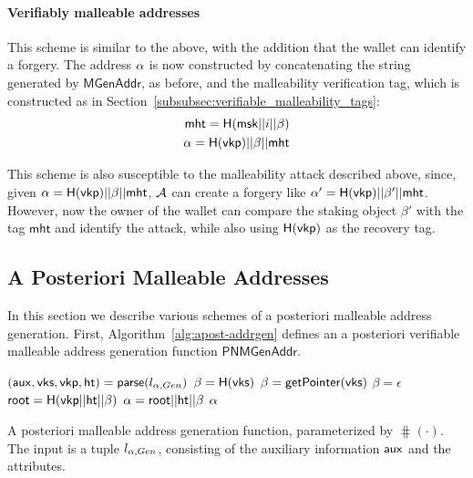 \paragraph{Verifiably malleable addresses}
This scheme is similar to the above, with the addition that the wallet can
identify a forgery.  The address $\alpha$ is now constructed by concatenating
the string generated by $\mathsf{MGenAddr}$, as before, and the malleability
verification tag, which is constructed as in
Section~\ref{subsubsec:verifiable_malleability_tags}:
\begin{align}
    \mathsf{mht} = \mathsf{H}(\mathsf{msk} || i || \beta) \\
    \alpha = \mathsf{H}(\mathsf{vkp}) || \beta || \mathsf{mht}
\end{align}

This scheme is also susceptible to the malleability attack described above,
since, given $\alpha = \mathsf{H}(\mathsf{vkp}) || \beta || \mathsf{mht}$, $\mathcal{A}$
can create a forgery like $\alpha' = \mathsf{H}(\mathsf{vkp}) || \beta'
|| \mathsf{mht}$. However, now the owner of the wallet can compare the staking object
$\beta'$ with the tag $\mathsf{mht}$ and identify the attack, while also using
$\mathsf{H}(\mathsf{vkp})$ as the recovery tag.

\subsection{A Posteriori Malleable Addresses}\label{subsec:non_malleable_addrgen}

In this section we describe various schemes of a posteriori malleable address
generation. First, Algorithm~\ref{alg:apost-addrgen} defines an a posteriori
verifiable malleable address generation function $\mathsf{PNMGenAddr}$.

\begin{algorithm}
    \begin{algorithmic}
            \State $(\mathsf{aux}, \mathsf{vks}, \mathsf{vkp}, \mathsf{ht}) = \mathsf{parse}(l_{\alpha, Gen})$
                    \State $\beta = \mathsf{H}(\mathsf{vks})$
                \EndCase
                    \State $\beta = \mathsf{getPointer}(\mathsf{vks})$
                \EndCase
                    \State $\beta = \epsilon$
                \EndCase
            \EndSwitch
            \State $\mathsf{root} = \mathsf{H}(\mathsf{vkp} || \mathsf{ht} || \beta)$
            \State $\alpha = \mathsf{root} || \mathsf{ht} || \beta$
            \State \Return $\alpha$
        \EndFunction
    \end{algorithmic}
    \caption{
        A posteriori malleable address generation function, parameterized
        by $\hash(\cdot)$. The input is a tuple $l_{\alpha, Gen}$, consisting
        of the auxiliary information $\mathsf{aux}$ and the attributes.
    }
    \label{alg:apost-addrgen}
\end{algorithm}

